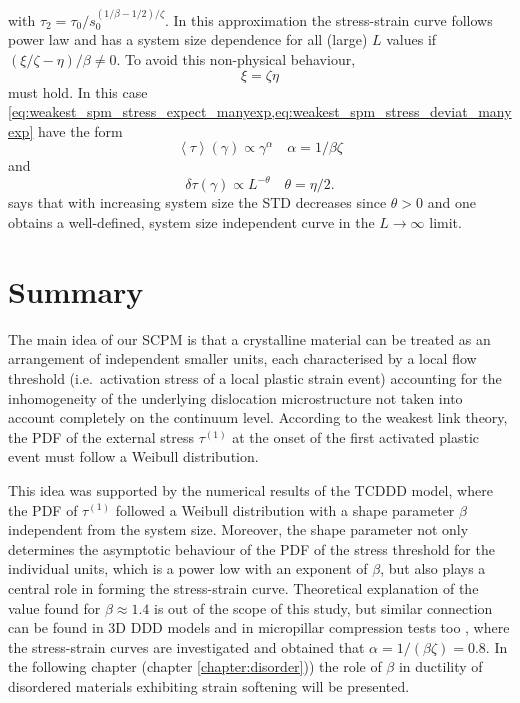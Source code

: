 with ${\tau _2} = {\tau _0}/s_0^{\left( {1/\beta  - 1/2} \right)/\zeta }$. In this approximation the stress-strain curve follows power law and has a system size dependence for all (large) $L$ values if $\left( {\xi /\zeta  - \eta } \right)/\beta  \ne 0$. To avoid this non-physical behaviour, 
\begin{equation}
\xi  = \zeta \eta
\end{equation}
must hold. In this case \cref{eq:weakest_spm_stress_expect_manyexp,eq:weakest_spm_stress_deviat_manyexp} have the form
\begin{equation}
\left\langle \tau  \right\rangle \left( \gamma  \right) \propto {\gamma ^\alpha }\quad \alpha  = 1/\beta \zeta 
\end{equation}
and
\begin{equation} \label{eq:weakest_spm_stress_deviat_oneexp}
\delta \tau \left( \gamma  \right) \propto {L^{ - \theta }}\quad \theta  = \eta /2.
\end{equation}
 says that with increasing system size the STD decreases since $\theta>0$ and one obtains a well-defined, system size independent curve in the $L \to \infty$ limit.

\section{Summary}
The main idea of our SCPM is that a crystalline material can be treated as an arrangement of independent smaller units, each characterised by a local flow threshold (i.e.\ activation stress of a local plastic strain event) accounting for the inhomogeneity of the underlying dislocation microstructure not taken into account completely on the continuum level. According to the weakest link theory, the PDF of the external stress ${\tau ^{\left( 1 \right)}}$ at the onset of the first activated plastic event must follow a Weibull distribution.

This idea was supported by the numerical results of the TCDDD model, where the PDF of ${\tau ^{\left( 1 \right)}}$ followed a Weibull distribution with a shape parameter $\beta$ independent from the system size. Moreover, the shape parameter not only determines the asymptotic behaviour of the PDF of the stress threshold for the individual units, which is a power low with an exponent of $\beta$, but also plays a central role in forming the stress-strain curve. Theoretical explanation of the value found for $\beta \approx 1.4$ is out of the scope of this study, but similar connection can be found in 3D DDD models and in micropillar compression tests too \cite{ispanovity2010submicron,ISPANOVITY20136234}, where the stress-strain curves are investigated and obtained that $\alpha  = 1/\left( {\beta \zeta } \right) = 0.8$. In the following chapter (chapter \ref{chapter:disorder})) the role of $\beta$ in ductility of disordered materials exhibiting strain softening will be presented.

